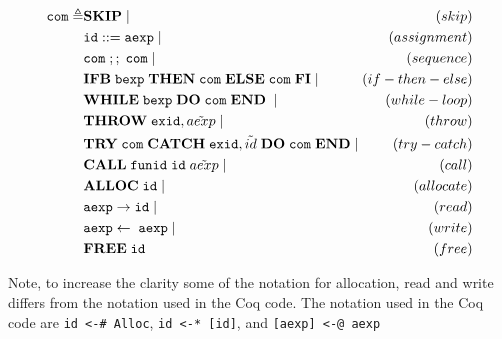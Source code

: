 \begin{equation}
\begin{alignedat}{2}
\verb|com| \triangleq & \textbf{SKIP} \;|\; & (skip) \\&
	\verb|id| ::= \verb|aexp| \;|\; & (assignment) \\&
	\verb|com|\; ;;\; \verb|com| \;|\; & (sequence) \\&
	\textbf{IFB}\; \verb|bexp|\; \textbf{THEN}\; \verb|com|\; \textbf{ELSE}\; \verb|com|\; \textbf{FI} \;|\; & (if-then-else) \\&
	\textbf{WHILE}\; \verb|bexp|\; \textbf{DO}\; \verb|com|\; \textbf{END}\; \;|\; & (while-loop) \\&
	\textbf{THROW}\; \verb|exid|, \tilde{aexp} \;|\; & (throw) \\&
	\textbf{TRY}\; \verb|com|\; \textbf{CATCH}\; \verb|exid|, \tilde{id}\; \textbf{DO}\; \verb|com|\; \textbf{END} \;|\; & (try-catch) \\&
	\textbf{CALL}\; \verb|funid|\; \verb|id|\; \tilde{aexp} \;|\; & (call) \\&
	\textbf{ALLOC}\;\verb|id| \;|\; & (allocate) \\&
	\verb|aexp| \rightarrow \verb|id|\;|\; & (read) \\&
	\verb|aexp|\leftarrow\;\verb|aexp| \;|\; & (write) \\&
	\textbf{FREE}\;\verb|id| & (free)
\end{alignedat}
\end{equation}

{\scriptsize
Note, to increase the clarity some of the notation for allocation, read and write differs from the notation used in the Coq code. The notation used in the Coq code are \verb|id <-# Alloc|, \verb|id <-* [id]|, and \verb|[aexp] <-@ aexp|
}